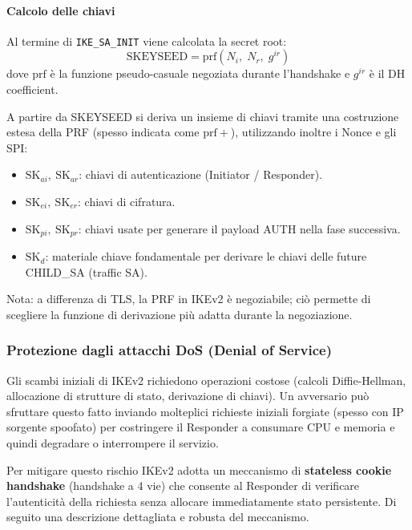 \documentclass[a4paper, 11pt]{article}
\begin{document}
\paragraph{Calcolo delle chiavi}
Al termine di \texttt{IKE\_SA\_INIT} viene calcolata la secret root:
\[
    \mathrm{SKEYSEED} = \mathrm{prf}(N_i,\; N_r,\; g^{ir})
\]
dove \(\mathrm{prf}\) è la funzione pseudo-casuale negoziata durante l'handshake e $g^{ir}$ è il DH coefficient.

A partire da SKEYSEED si deriva un insieme di chiavi tramite una costruzione estesa della PRF (spesso indicata come \(\mathrm{prf+}\)), utilizzando inoltre i Nonce e gli SPI:

\begin{itemize}
    \item \(\mathrm{SK}_{ai},\ \mathrm{SK}_{ar}\): chiavi di autenticazione (Initiator / Responder).
    \item \(\mathrm{SK}_{ei},\ \mathrm{SK}_{er}\): chiavi di cifratura.
    \item \(\mathrm{SK}_{pi},\ \mathrm{SK}_{pr}\): chiavi usate per generare il payload AUTH nella fase successiva.
    \item \(\mathrm{SK}_{d}\): materiale chiave fondamentale per derivare le chiavi delle future CHILD\_SA (traffic SA).
\end{itemize}

Nota: a differenza di TLS, la PRF in IKEv2 è negoziabile; ciò permette di scegliere la funzione di derivazione più adatta durante la negoziazione.

\subsubsection{Protezione dagli attacchi DoS (Denial of Service)}

Gli scambi iniziali di IKEv2 richiedono operazioni costose (calcoli Diffie-Hellman, allocazione di strutture di stato, derivazione di chiavi). Un avversario può sfruttare questo fatto inviando molteplici richieste iniziali forgiate (spesso con IP sorgente spoofato) per costringere il Responder a consumare CPU e memoria e quindi degradare o interrompere il servizio. 

Per mitigare questo rischio IKEv2 adotta un meccanismo di \textbf{stateless cookie handshake} (handshake a 4 vie) che consente al Responder di verificare l'autenticità della richiesta senza allocare immediatamente stato persistente. Di seguito una descrizione dettagliata e robusta del meccanismo.
\end{document}
